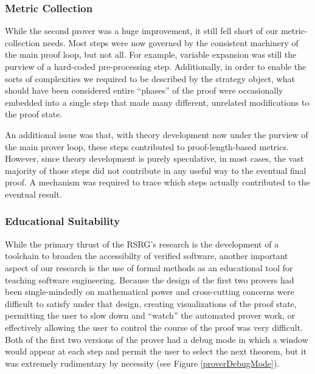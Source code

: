 		\subsubsection{Metric Collection}

While the second prover was a huge improvement, it still fell short of our metric-collection needs.  Most steps were now governed by the consistent machinery of the main proof loop, but not all.  For example, variable expansion was still the purview of a hard-coded pre-processing step.  Additionally, in order to enable the sorts of complexities we required to be described by the strategy object, what should have been considered entire ``phases'' of the proof were occasionally embedded into a single step that made many different, unrelated modifications to the proof state.

An additional issue was that, with theory development now under the purview of the main prover loop, these steps contributed to proof-length-based metrics.  However, since theory development is purely speculative, in most cases, the vast majority of those steps did not contribute in any useful way to the eventual final proof.  A mechanism was required to trace which steps actually contributed to the eventual result.

		\subsubsection{Educational Suitability}

While the primary thrust of the RSRG's research is the development of a toolchain to broaden the accessibilty of verified software, another important aspect of our research is the use of formal methods as an educational tool for teaching software engineering.  Because the design of the first two provers had been single-mindedly on mathematical power and cross-cutting concerns were difficult to satisfy under that design, creating visualizations of the proof state, permitting the user to slow down and ``watch'' the automated prover work, or effectively allowing the user to control the course of the proof was very difficult.  Both of the first two versions of the prover had a debug mode in which a window would appear at each step and permit the user to select the next theorem, but it was extremely rudimentary by necessity (see Figure \ref{proverDebugMode}).

